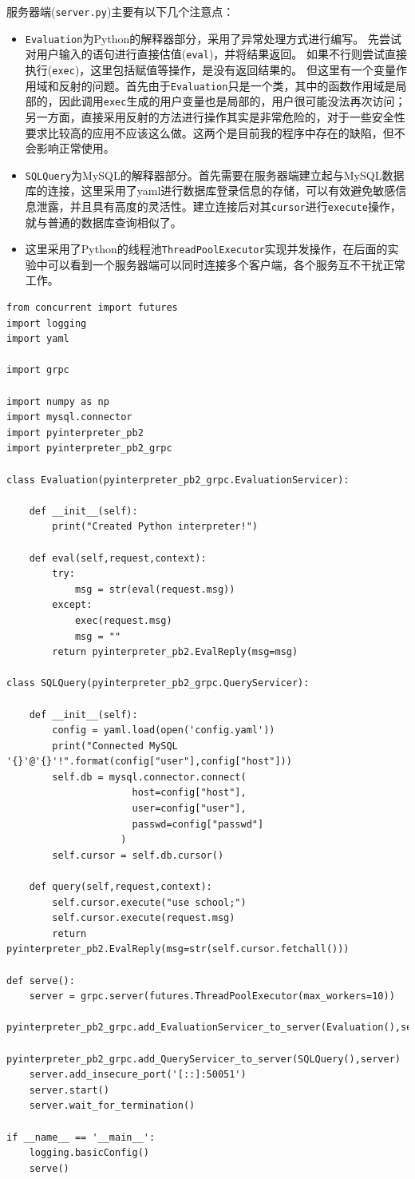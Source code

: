 \documentclass[logo,reportComp]{thesis}
\begin{document}
服务器端(\verb'server.py')主要有以下几个注意点：
\begin{itemize}
	\item \verb'Evaluation'为Python的解释器部分，采用了异常处理方式进行编写。
	先尝试对用户输入的语句进行直接估值(\verb'eval')，并将结果返回。
	如果不行则尝试直接执行(\verb'exec')，这里包括赋值等操作，是没有返回结果的。
	但这里有一个变量作用域和反射的问题。首先由于\verb'Evaluation'只是一个类，其中的函数作用域是局部的，因此调用\verb'exec'生成的用户变量也是局部的，用户很可能没法再次访问；另一方面，直接采用反射的方法进行操作其实是非常危险的，对于一些安全性要求比较高的应用不应该这么做。这两个是目前我的程序中存在的缺陷，但不会影响正常使用。
	\item \verb'SQLQuery'为MySQL的解释器部分。首先需要在服务器端建立起与MySQL数据库的连接，这里采用了yaml进行数据库登录信息的存储，可以有效避免敏感信息泄露，并且具有高度的灵活性。建立连接后对其\verb'cursor'进行\verb'execute'操作，就与普通的数据库查询相似了。
	\item 这里采用了Python的线程池\verb'ThreadPoolExecutor'实现并发操作，在后面的实验中可以看到一个服务器端可以同时连接多个客户端，各个服务互不干扰正常工作。
\end{itemize}
\begin{lstlisting}
from concurrent import futures
import logging
import yaml

import grpc

import numpy as np
import mysql.connector
import pyinterpreter_pb2
import pyinterpreter_pb2_grpc

class Evaluation(pyinterpreter_pb2_grpc.EvaluationServicer):

	def __init__(self):
		print("Created Python interpreter!")

	def eval(self,request,context):
		try:
			msg = str(eval(request.msg))
		except:
			exec(request.msg)
			msg = ""
		return pyinterpreter_pb2.EvalReply(msg=msg)

class SQLQuery(pyinterpreter_pb2_grpc.QueryServicer):

	def __init__(self):
		config = yaml.load(open('config.yaml'))
		print("Connected MySQL '{}'@'{}'!".format(config["user"],config["host"]))
		self.db = mysql.connector.connect(
					  host=config["host"],
					  user=config["user"],
					  passwd=config["passwd"]
					)
		self.cursor = self.db.cursor()

	def query(self,request,context):
		self.cursor.execute("use school;")
		self.cursor.execute(request.msg)
		return pyinterpreter_pb2.EvalReply(msg=str(self.cursor.fetchall()))

def serve():
	server = grpc.server(futures.ThreadPoolExecutor(max_workers=10))
	pyinterpreter_pb2_grpc.add_EvaluationServicer_to_server(Evaluation(),server)
	pyinterpreter_pb2_grpc.add_QueryServicer_to_server(SQLQuery(),server)
	server.add_insecure_port('[::]:50051')
	server.start()
	server.wait_for_termination()

if __name__ == '__main__':
	logging.basicConfig()
	serve()
\end{lstlisting}
\end{document}
